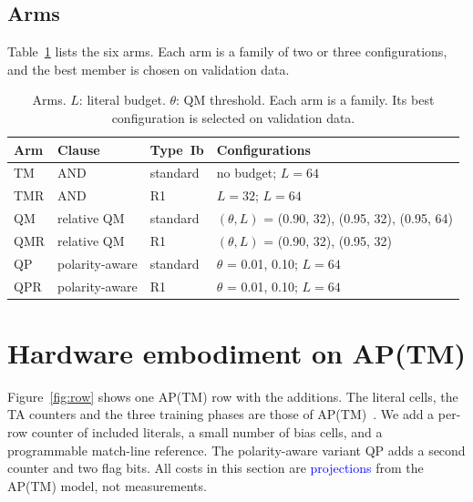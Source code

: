 \documentclass[preprint,12pt,times]{elsarticle}
\newcommand{\proj}[1]{\textcolor{blue}{#1}}
\newcommand{\add}[1]{{\color{blue}#1}}
\begin{document}
\subsection{Arms}
Table~\ref{tab:arms} lists the six arms.
Each arm is a family of two or three configurations, and the best member is chosen on validation data.

\begin{table}[!htbp]
\centering
\caption{Arms. $L$: literal budget. $\theta$: QM threshold. Each arm is a family. Its best configuration is selected on validation data.}
\label{tab:arms}
\footnotesize
\setlength{\tabcolsep}{5pt}
\begin{tabular}{lllp{2.9cm}}
\toprule
Arm & Clause & Type~Ib & Configurations \\
\midrule
TM & AND & standard & no budget; $L=64$ \\
TMR & AND & R1 & $L = 32$; $L=64$ \\
QM & relative QM & standard & $(\theta, L)$ = (0.90, 32), (0.95, 32), (0.95, 64) \\
QMR & relative QM & R1 & $(\theta, L)$ = (0.90, 32), (0.95, 32) \\
QP & polarity-aware & standard & $\theta$ = 0.01, 0.10; $L=64$ \\
QPR & polarity-aware & R1 & $\theta$ = 0.01, 0.10; $L=64$ \\
\bottomrule
\end{tabular}
\end{table}

\section{Hardware embodiment on AP(TM)}
\label{sec:hw}

Figure~\ref{fig:row} shows one AP(TM) row with the additions.
The literal cells, the TA counters and the three training phases are those of AP(TM)~\cite{shrot2026aptm}.
We add a per-row counter of included literals, a small number of bias cells, and a programmable match-line reference.
\add{The polarity-aware variant QP adds a second counter and two flag bits.}
All costs in this section are \proj{projections} from the AP(TM) model, not measurements.
\end{document}

